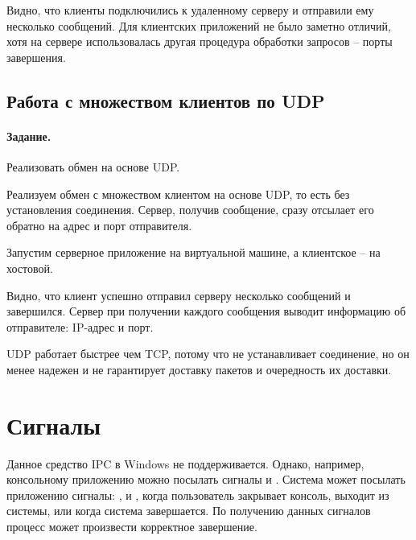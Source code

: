 

Видно, что клиенты подключились к удаленному серверу и отправили ему несколько сообщений. Для клиентских приложений не было заметно отличий, хотя на сервере использовалась другая процедура обработки запросов -- порты завершения.


\subsection{Работа с множеством клиентов по UDP}

\paragraph{Задание.} Реализовать обмен на основе UDP.

Реализуем обмен с множеством клиентом на основе UDP, то есть без установления соединения. Сервер, получив сообщение, сразу отсылает его обратно на адрес и порт отправителя.





Запустим серверное приложение на виртуальной машине, а клиентское -- на хостовой.





Видно, что клиент успешно отправил серверу несколько сообщений и завершился. Сервер при получении каждого сообщения выводит информацию об отправителе: IP-адрес и порт.

UDP работает быстрее чем TCP, потому что не устанавливает соединение, но он менее надежен и не гарантирует доставку пакетов и очередность их доставки.

\section{Сигналы}

Данное средство IPC в Windows не поддерживается. Однако, например, консольному приложению можно посылать сигналы \caret{} и \caret{}. Система может посылать приложению сигналы: \caret{}, \caret{} и \caret{}, когда пользователь закрывает консоль, выходит из системы, или когда система завершается. По получению данных сигналов процесс может произвести корректное завершение.

